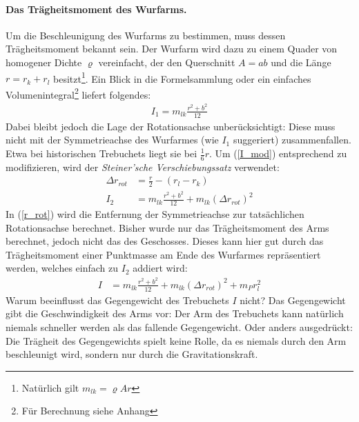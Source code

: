 \paragraph{Das Trägheitsmoment des Wurfarms.}
Um die Beschleunigung des Wurfarms zu bestimmen, muss dessen Trägheitsmoment bekannt sein. Der Wurfarm wird dazu zu einem Quader von homogener Dichte $\varrho$ vereinfacht, der den Querschnitt $A =a b$ und die Länge $r=r_k+r_l$ besitzt\footnote{Natürlich gilt $m_{lk}=\varrho A r$}. Ein Blick in die Formelsammlung oder ein einfaches Volumenintegral\footnote{Für Berechnung siehe Anhang} liefert folgendes:
\begin{align}
\label{I_mod}
I_1= m_{lk} \frac{r^2+b^2}{12}
\end{align}
Dabei bleibt jedoch die Lage der Rotationsachse unberücksichtigt: Diese muss nicht mit der Symmetrieachse des Wurfarmes (wie $I_1$ suggeriert) zusammenfallen. Etwa bei historischen Trebuchets liegt sie bei $\frac{1}{6}r$. Um (\ref{I_mod}) entsprechend zu modifizieren, wird der \emph{Steiner'sche Verschiebungssatz} verwendet:
\begin{align}
\label{r_rot}
\Delta r_{rot}&=\frac{r}{2}-(r_l-r_k)\\
\label{traegheitsmoment-n2}
I_2 &= m_{lk} \frac{r^2+b^2}{12} + m_{lk} (\Delta r_{rot})^2
\end{align}
In (\ref{r_rot}) wird die Entfernung der Symmetrieachse zur tatsächlichen Rotationsachse berechnet. Bisher wurde nur das Trägheitsmoment des Arms berechnet, jedoch nicht das des Geschosses. Dieses kann hier gut durch das Trägheitsmoment einer Punktmasse am Ende des Wurfarmes repräsentiert werden, welches einfach zu $I_2$ addiert wird:
\begin{align}
\label{traegheitsmoment}
I&=m_{lk} \frac{r^2+b^2}{12} + m_{lk} (\Delta r_{rot})^2+m_P r_l^2
\end{align}
Warum beeinflusst das Gegengewicht des Trebuchets $I$ nicht? Das Gegengewicht gibt die Geschwindigkeit des Arms vor: Der Arm des Trebuchets kann natürlich niemals schneller werden als das fallende Gegengewicht. Oder anders ausgedrückt: Die Trägheit des Gegengewichts spielt keine Rolle, da es niemals durch den Arm beschleunigt wird, sondern nur durch die Gravitationskraft.

\label{endgesch-starr}
